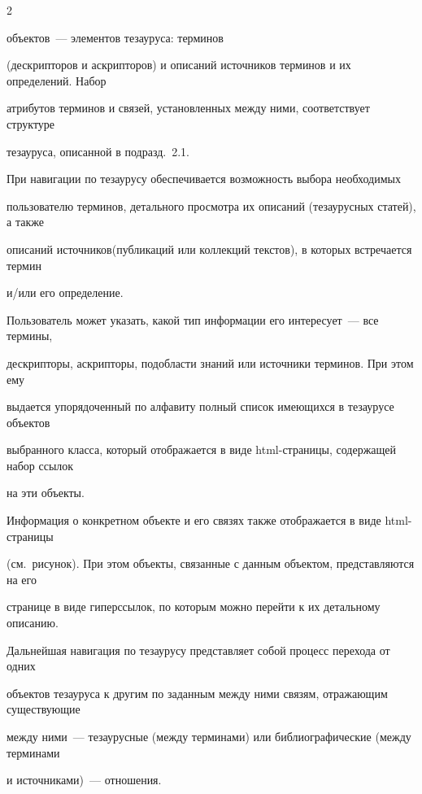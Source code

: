 \begin{multicols}{2}



\noindent

 объектов~--- элементов тезауруса: терминов 

(дескрипторов и аскрипторов) и описаний источников терминов и их определений. Набор 

атрибутов терминов и связей, установленных между ними, соответствует структуре 

тезауруса, описанной в подразд.~2.1.

  

  При навигации по тезаурусу обеспечивается возможность выбора необходимых 

пользователю терминов, детального просмотра их описаний (тезаурусных статей), а также 

описаний источников\linebreak (публикаций или коллекций текстов), в которых встречается термин 

и/или его определение.

  

  Пользователь может указать, какой тип информации его интересует~--- все термины, 

дескрипторы, аскрипторы, подобласти знаний или источники терминов. При этом ему 

выдается упорядоченный по алфавиту полный список имеющихся в тезаурусе объектов 

выбранного класса, который отображается в виде html-страницы, содержащей набор ссылок 

на эти объекты. 

  

  Информация о конкретном объекте и его связях также отображается в виде html-страницы 

(см.\ рисунок). При этом объекты, связанные с данным объектом, представляются на его 

странице в виде гиперссылок, по которым можно перейти к их детальному описанию.

  

  Дальнейшая навигация по тезаурусу представляет собой процесс перехода от одних 

объектов тезауруса к другим по заданным между ними связям, отражающим существующие 

между ними~--- тезаурусные (между терминами) или библиографические (между терминами 

и источниками)~--- отношения.






\end{multicols}
